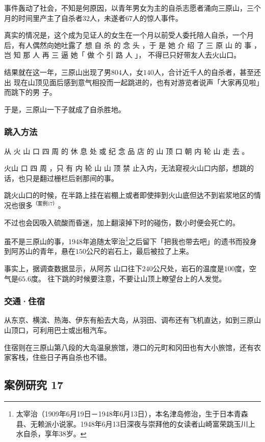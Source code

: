 \documentclass[UTF8]{ctexart}
\begin{document}
事件轰动了社会，不知是何原因，以青年男女为主的自杀志愿者涌向三原山，三个月的时间里产主了自杀者$32$人，未遂者$67$人的惊人事件。

真实的情况是，这个成为见证人的女生在一个月以前受人委托陪人自杀，一个月后，有人偶然向她吐露了 想 自 杀 的 念 头 ，于 是 她 介 绍 了 三 原 山 的 事 ，岂 知 那 人 再 三 逼 她「 做 个 引 路 人 」， 不得已只好带友人去火山口。

结果就在这一年，三原山出现了男$804$人，女$140$人，合计近千人的自杀者，甚至还出 现在山顶见面后感到意气相投而一起跳进的，也有对游览者说声「大家再见啦」而跳下的男 子。

于是，三原山一下子就成了自杀胜地。

\subsubsection{跳入方法}

从 火 山 口 四 周 的 休 息 处 或 纪 念 品 店 的 山 顶 口 朝 内 轮 山 走 去 。

火山 口 四 周 ，只 有 内 轮 山 山 顶 禁 止入内，无法窥视火山口内部，想跳的话，也只是翻过栅栏后剎那间的事。 

跳火山口的时候，在半路上挂在岩棚上或者即使摔到火山底但达不到岩浆地区的情况也很多$^{（案例 17）}$。

不过也会因吸入硫酸而昏迷，加上翻滚掉下时的碰伤，数小时便会死亡的。 

虽不是三原山的事，1948年追随太宰治\footnote{太宰治（1909年6月19日－1948年6月13日），本名津岛修治，生于日本青森县、无赖派小说家。1948年6月13日深夜与崇拜他的女读者山崎富荣跳玉川上水自杀，享年38岁。}之后留下「把我也带去吧」的遗书而投身到阿苏山的青年，悬在$150$公尺的岩石上，最后被拉了上来。

事实上，据调查数据显示，从阿苏 山口往下$240$公尺处，岩石的温度是$100$度，空气$是65.6$度。 往下跳的时候要注意，不要让山顶上瞭望台上的人发觉。

\subsubsection{交通·住宿}

从东京、横滨、热海、伊东有船去大岛，从羽田、调布还有飞机直达，如到三原山山顶口，可利用巴士或出租汽车。

住宿则在三原山第八段的大岛温泉旅馆，港口的元町和冈田也有大小旅馆，还有农家客栈，住些日子再自杀也不错。


\subsection{案例研究 17}
\end{document}
